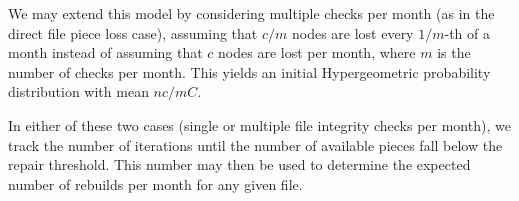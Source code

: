 We may extend this model by considering multiple checks per month (as in the direct file piece loss case), assuming that $c/m$ nodes are lost every $1/m$-th of a month instead of assuming that $c$ nodes are lost per month, where $m$ is the number of checks per month. This yields an initial Hypergeometric probability distribution with mean $nc/mC$.

In either of these two cases (single or multiple file integrity checks per month), we track the number of iterations until the number of available pieces fall below the repair threshold. This number may then be used to determine the expected number of rebuilds per month for any given file.